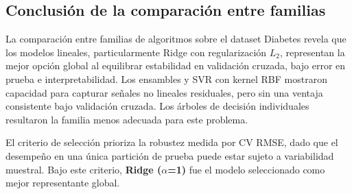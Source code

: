 \begin{table}[H]
\centering
\caption{Ventajas y limitaciones de cada familia en el contexto del dataset Diabetes.}
\end{table}

\subsection{Conclusión de la comparación entre familias}

La comparación entre familias de algoritmos sobre el dataset Diabetes revela que los modelos lineales, particularmente Ridge con regularización $L_2$, representan la mejor opción global al equilibrar estabilidad en validación cruzada, bajo error en prueba e interpretabilidad. Los ensambles y SVR con kernel RBF mostraron capacidad para capturar señales no lineales residuales, pero sin una ventaja consistente bajo validación cruzada. Los árboles de decisión individuales resultaron la familia menos adecuada para este problema.

El criterio de selección prioriza la robustez medida por CV RMSE, dado que el desempeño en una única partición de prueba puede estar sujeto a variabilidad muestral. Bajo este criterio, \textbf{Ridge ($\alpha$=1)} fue el modelo seleccionado como mejor representante global.
